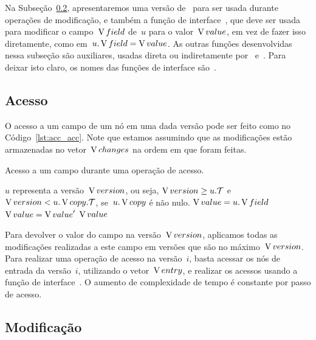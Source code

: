 \documentclass[main.tex]{subfiles}
\begin{document}
\newcommand{\auxfunc}[1]{\underline{#1}}

Na Subseção~\ref{subsec:nodecopying_modificacao}, apresentaremos uma versão de~ para ser usada durante operações de modificação, e também a função de interface~, que deve ser usada para modificar o campo~$\operatorname{V}{field}$ de~$u$ para o valor~$\operatorname{V}{value}$, em vez de fazer isso diretamente, como em~${u.\operatorname{V}{field} = \operatorname{V}{value}}$. As outras funções desenvolvidas nessa subseção são auxiliares, usadas direta ou indiretamente por~ e~. Para deixar isto claro, os nomes das funções de interface são~.

\subsection{Acesso} \label{subsec:nodecopying_acesso}

O acesso a um campo de um nó em uma dada versão pode ser feito como no Código~\ref{lst:acc_acc}. Note que estamos assumindo que as modificações estão armazenadas no vetor~$\operatorname{V}{changes}$ na ordem em que foram feitas.

\begin{algorithm}
\caption{Acesso a um campo durante uma operação de acesso.} \label{lst:acc_acc}
\begin{algorithmic}[1]

\Require $u$ representa a versão~$\operatorname{V}{version}$, ou seja, $\operatorname{V}{version} \geq u.\mathcal{T}$ e~$\operatorname{V}{version} < u.\operatorname{V}{copy}.\mathcal{T}$, se~$u.\operatorname{V}{copy}$ é não nulo.
	\State $\operatorname{V}{value} = u.\operatorname{V}{field}$
			\State $\operatorname{V}{value} = \operatorname{V}{value}'$
		\EndIf
	\EndFor
	\State \Return $\operatorname{V}{value}$
\EndFunction

\end{algorithmic}
\end{algorithm}

Para devolver o valor do campo na versão~$\operatorname{V}{version}$, aplicamos todas as modificações realizadas a este campo em versões que são no máximo~$\operatorname{V}{version}$. Para realizar uma operação de acesso na versão~$i$, basta acessar os nós de entrada da versão~$i$, utilizando o vetor~$\operatorname{V}{entry}$, e realizar os acessos usando a função de interface~. O aumento de complexidade de tempo é constante por passo de acesso.

\subsection{Modificação} \label{subsec:nodecopying_modificacao}
\end{document}
